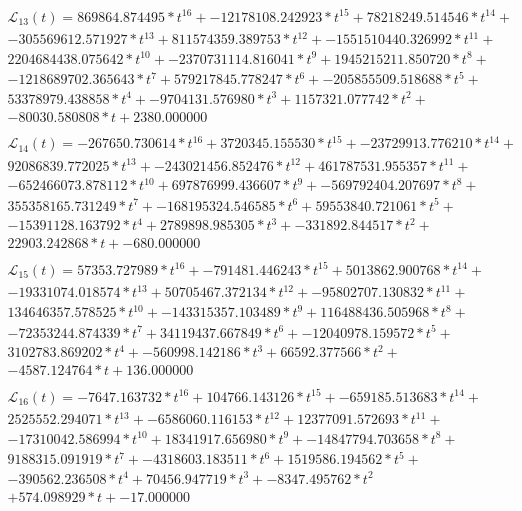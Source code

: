 \documentclass[12pt]{article}
\begin{document}
\begin{gather*}
	\mathcal{L}_{13}(t) = 869864.874495*t^{16} + -12178108.242923*t^{15} + 78218249.514546*t^{14} + \\ -305569612.571927*t^{13} + 811574359.389753*t^{12} + -1551510440.326992*t^{11} + \\ 2204684438.075642*t^{10} + -2370731114.816041*t^{9} + 1945215211.850720*t^{8} + \\ -1218689702.365643*t^{7} + 579217845.778247*t^{6} + -205855509.518688*t^{5} + \\ 53378979.438858*t^{4} + -9704131.576980*t^{3} + 1157321.077742*t^{2} + \\ -80030.580808*t + 2380.000000 \\ \\
	\mathcal{L}_{14}(t) = -267650.730614*t^{16} + 3720345.155530*t^{15} + -23729913.776210*t^{14} + \\ 92086839.772025*t^{13} + -243021456.852476*t^{12} + 461787531.955357*t^{11} + \\ -652466073.878112*t^{10} + 697876999.436607*t^{9} + -569792404.207697*t^{8} + \\ 355358165.731249*t^{7} + -168195324.546585*t^{6} + 59553840.721061*t^{5} + \\ -15391128.163792*t^{4} + 2789898.985305*t^{3} + -331892.844517*t^{2} + \\ 22903.242868*t + -680.000000 \\ \\
	\mathcal{L}_{15}(t) = 57353.727989*t^{16} + -791481.446243*t^{15} + 5013862.900768*t^{14} + \\ -19331074.018574*t^{13} + 50705467.372134*t^{12} + -95802707.130832*t^{11} + \\ 134646357.578525*t^{10} + -143315357.103489*t^{9} + 116488436.505968*t^{8} + \\ -72353244.874339*t^{7} + 34119437.667849*t^{6} + -12040978.159572*t^{5} + \\ 3102783.869202*t^{4} + -560998.142186*t^{3} + 66592.377566*t^{2} + \\ -4587.124764*t + 136.000000 \\ \\
	\mathcal{L}_{16}(t) = -7647.163732*t^{16} + 104766.143126*t^{15} + -659185.513683*t^{14} + \\ 2525552.294071*t^{13} + -6586060.116153*t^{12} + 12377091.572693*t^{11} + \\ -17310042.586994*t^{10} + 18341917.656980*t^{9} + -14847794.703658*t^{8} + \\ 9188315.091919*t^{7} + -4318603.183511*t^{6} + 1519586.194562*t^{5} + \\ -390562.236508*t^{4} + 70456.947719*t^{3} + -8347.495762*t^{2} \\ + 574.098929*t + -17.000000 \\ \\

\end{gather*}
\end{document}
